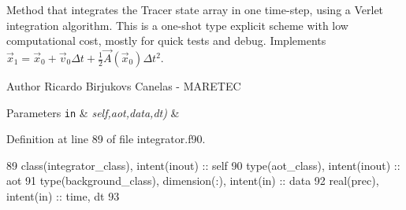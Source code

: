 Method that integrates the Tracer state array in one time-\/step, using a Verlet integration algorithm. This is a one-\/shot type explicit scheme with low computational cost, mostly for quick tests and debug. Implements $ {\vec {x}}_{1}={\vec {x}}_{0}+{\vec {v}}_{0}\Delta t+{\frac {1}{2}}{\vec {A}}({\vec {x}}_{0})\Delta t^{2}$. 

\begin{DoxyAuthor}{Author}
Ricardo Birjukovs Canelas -\/ M\+A\+R\+E\+T\+EC 
\end{DoxyAuthor}

\begin{DoxyParams}[1]{Parameters}
\mbox{\tt in}  & {\em self,aot,data,dt)} & \\
\hline
\end{DoxyParams}


Definition at line 89 of file integrator.\+f90.


\begin{DoxyCode}
89     \textcolor{keywordtype}{class}(integrator\_class), \textcolor{keywordtype}{intent(inout)} :: self
90     \textcolor{keywordtype}{type}(aot\_class), \textcolor{keywordtype}{intent(inout)} :: aot
91     \textcolor{keywordtype}{type}(background\_class), \textcolor{keywordtype}{dimension(:)}, \textcolor{keywordtype}{intent(in)} :: data
92     \textcolor{keywordtype}{real(prec)}, \textcolor{keywordtype}{intent(in)} :: time, dt
93            
\end{DoxyCode}
